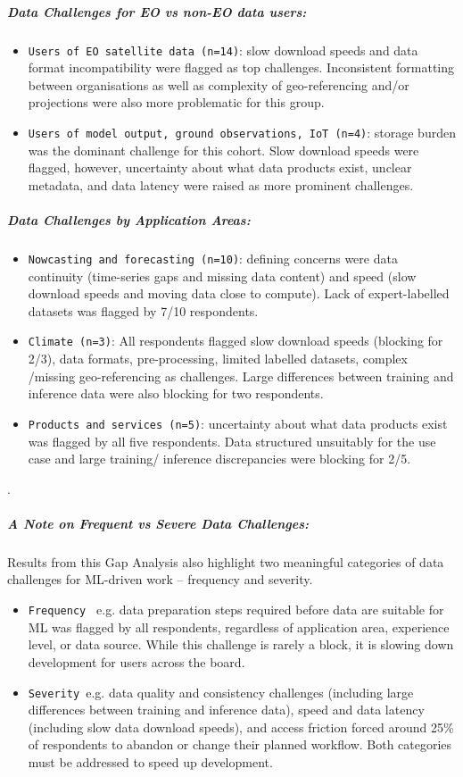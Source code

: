 \documentclass[acmtog,nonacm]{acmart}
\begin{document}
\subparagraph{\textbf{Data Challenges for EO vs non-EO data users:}}
\begin{itemize}
\item {\texttt{Users of EO satellite data (n=14)}}: slow download speeds and data format incompatibility were flagged as top challenges. Inconsistent formatting between organisations as well as complexity of geo-referencing and/or projections were also more problematic for this group.
\item{\texttt{Users of model output, ground observations, IoT (n=4)}}: storage burden was the dominant challenge for this cohort. Slow download speeds were flagged, however, uncertainty about what data products exist, unclear metadata, and data latency were raised as more prominent challenges.
\end{itemize}

\subparagraph{\textbf{Data Challenges by Application Areas:}}
\begin{itemize}
\item {\texttt{Nowcasting and forecasting (n=10)}}: defining concerns were data continuity (time-series gaps and missing data content) and speed (slow download speeds and moving data close to compute). Lack of expert-labelled datasets was flagged by 7/10 respondents.
\item {\texttt{Climate (n=3)}}: All respondents flagged slow download speeds (blocking for 2/3), data formats, pre-processing, limited labelled datasets, complex /missing geo-referencing as challenges. Large differences between training and inference data were also blocking for two respondents.
\item{\texttt{Products and services (n=5)}}: uncertainty about what data products exist was flagged by all five respondents. Data structured unsuitably for the use case and large training/ inference discrepancies were blocking for 2/5. 
\end{itemize}
.\\
\subparagraph{{\textbf{A Note on Frequent vs Severe Data Challenges:}}}
Results from this Gap Analysis also highlight two meaningful categories of data challenges for ML-driven work – frequency and severity.
\begin{itemize}
\item {\texttt{Frequency }} e.g. data preparation steps required before data are suitable for ML was flagged by all respondents, regardless of application area, experience level, or data source. While this challenge is rarely a block, it is slowing down development for users across the board.
\item {\texttt{Severity }}e.g. data quality and consistency challenges (including large differences between training and inference data), speed and data latency (including slow data download speeds), and access friction forced around 25\% of respondents to abandon or change their planned workflow. Both categories must be addressed to speed up development.
\end{itemize}
\end{document}
